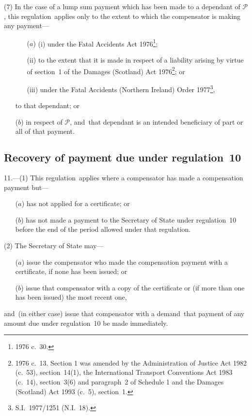 \documentclass[12pt,a4paper]{article}
\begin{document}
(7) In the case of a lump sum payment which has been made to a dependant of $\mathcal{P}$, this regulation~applies only to the extent to which the compensator is making any payment—
\begin{enumerate}\item[]
\begin{enumerate}
\item[($a$)] (i) under the Fatal Accidents Act 1976\footnote{1976 c.~30.};

(ii) to the extent that it is made in respect of a liability arising by virtue of section~1 of the Damages (Scotland) Act 1976\footnote{1976 c.~13. Section 1 was amended by the Administration of Justice Act 1982 (c.~53), section~14(1), the International Transport Conventions Act 1983 (c.~14), section~3(6) and paragraph~2 of Schedule 1 and the Damages (Scotland) Act 1993 (c.~5), section~1.}; or

(iii) under the Fatal Accidents (Northern Ireland) Order 1977\footnote{S.I.~1977/1251 (N.I.~18).},
\end{enumerate}
to that dependant; or

($b$) in respect of $\mathcal{P}$, and~that dependant is an intended beneficiary of part or all of that payment.
\end{enumerate}

\subsection[11. Recovery of payment due under regulation~10]{Recovery of payment due under regulation~10}

11.---(1)  This regulation~applies where a compensator has made a compensation payment but—
\begin{enumerate}\item[]
($a$) has not applied for a certificate; or

($b$) has not made a payment to the Secretary of State under regulation~10 before the end of the period allowed under that regulation.
\end{enumerate}

(2) The Secretary of State may—
\begin{enumerate}\item[]
($a$) issue the compensator who made the compensation payment with a certificate, if none has been issued; or

($b$) issue that compensator with a copy of the certificate or (if more than one has been issued) the most recent one,
\end{enumerate}
and~(in either case) issue that compensator with a demand~that payment of any amount due under regulation~10 be made immediately.
\end{document}
